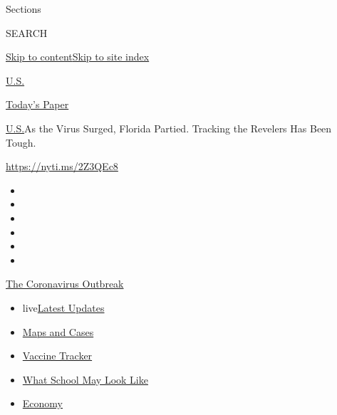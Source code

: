 Sections

SEARCH

\protect\hyperlink{site-content}{Skip to
content}\protect\hyperlink{site-index}{Skip to site index}

\href{https://www.nytimes.com/section/us}{U.S.}

\href{https://myaccount.nytimes.com/auth/login?response_type=cookie\&client_id=vi}{}

\href{https://www.nytimes.com/section/todayspaper}{Today's Paper}

\href{/section/us}{U.S.}\textbar{}As the Virus Surged, Florida Partied.
Tracking the Revelers Has Been Tough.

\url{https://nyti.ms/2Z3QEc8}

\begin{itemize}
\item
\item
\item
\item
\item
\item
\end{itemize}

\href{https://www.nytimes.com/news-event/coronavirus?action=click\&pgtype=Article\&state=default\&region=TOP_BANNER\&context=storylines_menu}{The
Coronavirus Outbreak}

\begin{itemize}
\tightlist
\item
  live\href{https://www.nytimes.com/2020/08/02/world/coronavirus-updates.html?action=click\&pgtype=Article\&state=default\&region=TOP_BANNER\&context=storylines_menu}{Latest
  Updates}
\item
  \href{https://www.nytimes.com/interactive/2020/us/coronavirus-us-cases.html?action=click\&pgtype=Article\&state=default\&region=TOP_BANNER\&context=storylines_menu}{Maps
  and Cases}
\item
  \href{https://www.nytimes.com/interactive/2020/science/coronavirus-vaccine-tracker.html?action=click\&pgtype=Article\&state=default\&region=TOP_BANNER\&context=storylines_menu}{Vaccine
  Tracker}
\item
  \href{https://www.nytimes.com/interactive/2020/07/29/us/schools-reopening-coronavirus.html?action=click\&pgtype=Article\&state=default\&region=TOP_BANNER\&context=storylines_menu}{What
  School May Look Like}
\item
  \href{https://www.nytimes.com/live/2020/07/31/business/stock-market-today-coronavirus?action=click\&pgtype=Article\&state=default\&region=TOP_BANNER\&context=storylines_menu}{Economy}
\end{itemize}

